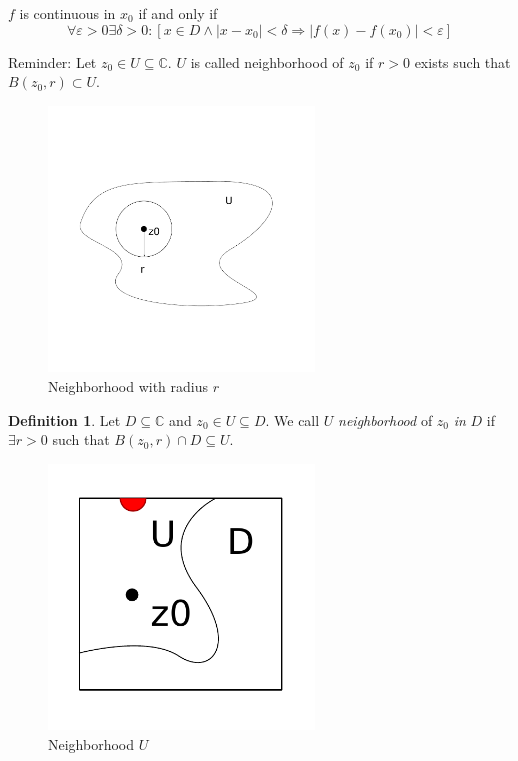 \documentclass[a4paper,landscape,twocolumn]{article}
\theoremstyle{definition}
\newtheorem{defi}{Definition}
\newcommand\abs[1]{\left|#1\right|}
\begin{document}
$f$ is continuous in $x_0$ if and only if
\[
  \forall \varepsilon > 0 \exists \delta > 0:
  [x \in D \land \abs{x - x_0} < \delta \Rightarrow \abs{f(x) - f(x_0)} < \varepsilon]
\]

Reminder:
Let $z_0 \in U \subseteq \mathbb C$.
$U$ is called neighborhood of $z_0$ if $r > 0$ exists such that $B(z_0, r) \subset U$.

\begin{figure}[!h]
  \begin{center}
    \includegraphics[width=200pt]{img/environment.pdf}
    \caption{Neighborhood with radius $r$}
  \end{center}
\end{figure}

\begin{defi}
  Let $D \subseteq \mathbb C$ and $z_0 \in U \subseteq D$.
  We call $U$ \emph{neighborhood} of $z_0$ \emph{in} $D$ if $\exists r > 0$
  such that $B(z_0, r) \cap D \subseteq U$.
\end{defi}

\begin{figure}[!h]
  \begin{center}
    \includegraphics[width=200pt]{img/environment_D_and_U.pdf}
    \caption{Neighborhood $U$}
  \end{center}
\end{figure}
\end{document}
